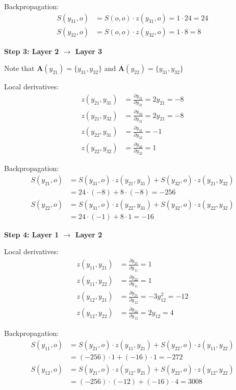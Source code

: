 \begin{notechapter}
Backpropagation:
\begin{align*}
S(y_{31},o) &= S(o,o) \cdot z(y_{31},o) = 1 \cdot 24 = 24\\
S(y_{32},o) &= S(o,o) \cdot z(y_{32},o) = 1 \cdot 8 = 8
\end{align*}

\textbf{Step 3: Layer 2 $\to$ Layer 3}

Note that $\mathbf{A}(y_{21}) = \{y_{31}, y_{32}\}$ and $\mathbf{A}(y_{22}) = \{y_{31}, y_{32}\}$

Local derivatives:
\begin{align*}
z(y_{21},y_{31}) &= \frac{\partial y_{31}}{\partial y_{21}} = 2y_{21} = -8\\
z(y_{21},y_{32}) &= \frac{\partial y_{32}}{\partial y_{21}} = 2y_{21} = -8\\
z(y_{22},y_{31}) &= \frac{\partial y_{31}}{\partial y_{22}} = -1\\
z(y_{22},y_{32}) &= \frac{\partial y_{32}}{\partial y_{22}} = 1
\end{align*}

Backpropagation:
\begin{align*}
S(y_{21},o) &= S(y_{31},o) \cdot z(y_{21},y_{31}) + S(y_{32},o) \cdot z(y_{21},y_{32})\\
&= 24 \cdot (-8) + 8 \cdot (-8) = -256\\[0.5em]
S(y_{22},o) &= S(y_{31},o) \cdot z(y_{22},y_{31}) + S(y_{32},o) \cdot z(y_{22},y_{32})\\
&= 24 \cdot (-1) + 8 \cdot 1 = -16
\end{align*}

\textbf{Step 4: Layer 1 $\to$ Layer 2}

Local derivatives:
\begin{align*}
z(y_{11},y_{21}) &= \frac{\partial y_{21}}{\partial y_{11}} = 1\\
z(y_{11},y_{22}) &= \frac{\partial y_{22}}{\partial y_{11}} = 1\\
z(y_{12},y_{21}) &= \frac{\partial y_{21}}{\partial y_{12}} = -3y_{12}^2 = -12\\
z(y_{12},y_{22}) &= \frac{\partial y_{22}}{\partial y_{12}} = 2y_{12} = 4
\end{align*}

Backpropagation:
\begin{align*}
S(y_{11},o) &= S(y_{21},o) \cdot z(y_{11},y_{21}) + S(y_{22},o) \cdot z(y_{11},y_{22})\\
&= (-256) \cdot 1 + (-16) \cdot 1 = -272\\[0.5em]
S(y_{12},o) &= S(y_{21},o) \cdot z(y_{12},y_{21}) + S(y_{22},o) \cdot z(y_{12},y_{22})\\
&= (-256) \cdot (-12) + (-16) \cdot 4 = 3008
\end{align*}


\end{notechapter}
